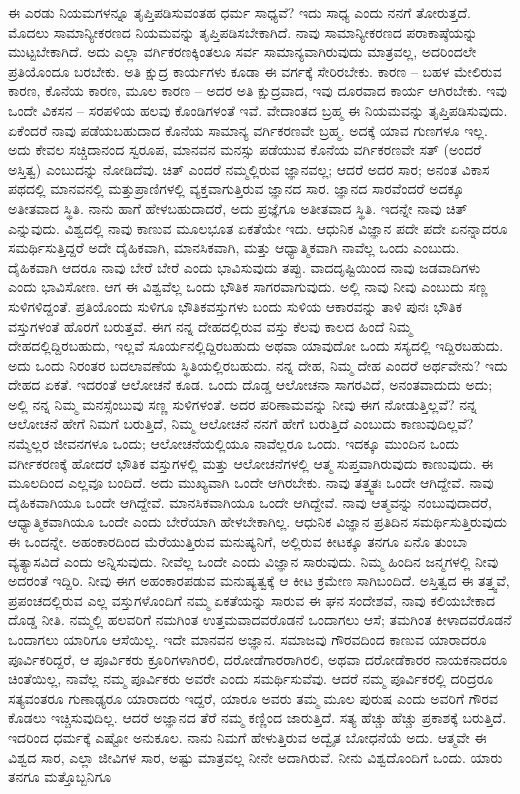 ಈ ಎರಡು ನಿಯಮಗಳನ್ನೂ ತೃಪ್ತಿಪಡಿಸುವಂತಹ ಧರ್ಮ ಸಾಧ್ಯವೆ? ಇದು ಸಾಧ್ಯ ಎಂದು ನನಗೆ ತೋರುತ್ತದೆ. ಮೊದಲು ಸಾಮಾನ್ಯೀಕರಣದ ನಿಯಮವನ್ನು ತೃಪ್ತಿಪಡಿಸಬೇಕಾಗಿದೆ. ನಾವು ಸಾಮಾನ್ಯೀಕರಣದ ಪರಾಕಾಷ್ಠೆಯನ್ನು ಮುಟ್ಟಬೇಕಾಗಿದೆ. ಅದು ಎಲ್ಲಾ ವರ್ಗಿಕರಣಕ್ಕಿಂತಲೂ ಸರ್ವ ಸಾಮಾನ್ಯವಾಗಿರುವುದು ಮಾತ್ರವಲ್ಲ, ಅದರಿಂದಲೇ ಪ್ರತಿಯೊಂದೂ ಬರಬೇಕು. ಅತಿ ಕ್ಷುದ್ರ ಕಾರ್ಯಗಳು ಕೂಡಾ ಈ ವರ್ಗಕ್ಕೆ ಸೇರಿರಬೇಕು. ಕಾರಣ – ಬಹಳ ಮೇಲಿರುವ ಕಾರಣ, ಕೊನೆಯ ಕಾರಣ, ಮೂಲ ಕಾರಣ – ಅದರ ಅತಿ ಕ್ಷುದ್ರವಾದ, ಇವು ದೂರವಾದ ಕಾರ್ಯ ಆಗಿರಬೇಕು. ಇವು ಒಂದೇ ವಿಕಸನ – ಸರಪಳಿಯ ಹಲವು ಕೊಂಡಿಗಳಂತೆ ಇವೆ. ವೇದಾಂತದ ಬ್ರಹ್ಮ ಈ ನಿಯಮವನ್ನು ತೃಪ್ತಿಪಡಿಸುವುದು. ಏಕೆಂದರೆ ನಾವು ಪಡೆಯಬಹುದಾದ ಕೊನೆಯ ಸಾಮಾನ್ಯ ವರ್ಗಿಕರಣವೇ ಬ್ರಹ್ಮ. ಅದಕ್ಕೆ ಯಾವ ಗುಣಗಳೂ ಇಲ್ಲ. ಅದು ಕೇವಲ ಸಚ್ಚಿದಾನಂದ ಸ್ವರೂಪ, ಮಾನವನ ಮನಸ್ಸು ಪಡೆಯುವ ಕೊನೆಯ ವರ್ಗಿಕರಣವೇ ಸತ್ (ಅಂದರೆ ಅಸ್ತಿತ್ವ) ಎಂಬುದನ್ನು ನೋಡಿದೆವು. ಚಿತ್ ಎಂದರೆ ನಮ್ಮಲ್ಲಿರುವ ಜ್ಞಾನವಲ್ಲ; ಆದರೆ ಅದರ ಸಾರ; ಅನಂತ ವಿಕಾಸ ಪಥದಲ್ಲಿ ಮಾನವನಲ್ಲಿ ಮತ್ತು\break ಪ್ರಾಣಿಗಳಲ್ಲಿ ವ್ಯಕ್ತವಾಗುತ್ತಿರುವ ಜ್ಞಾನದ ಸಾರ. ಜ್ಞಾನದ ಸಾರವೆಂದರೆ ಅದಕ್ಕೂ ಅತೀತವಾದ ಸ್ಥಿತಿ. ನಾನು ಹಾಗೆ ಹೇಳಬಹುದಾದರೆ, ಅದು ಪ್ರಜ್ಞೆಗೂ ಅತೀತವಾದ ಸ್ಥಿತಿ. ಇದನ್ನೇ ನಾವು ಚಿತ್ ಎನ್ನುವುದು. ವಿಶ್ವದಲ್ಲಿ ನಾವು ಕಾಣುವ ಮೂಲಭೂತ ಏಕತೆಯೇ ಇದು. ಆಧುನಿಕ ವಿಜ್ಞಾನ ಪದೇ ಪದೇ ಏನನ್ನಾದರೂ ಸಮರ್ಥಿಸುತ್ತಿದ್ದರೆ ಅದೇ ದೈಹಿಕವಾಗಿ, ಮಾನಸಿಕವಾಗಿ, ಮತ್ತು ಆಧ್ಯಾತ್ಮಿಕವಾಗಿ ನಾವೆಲ್ಲ ಒಂದು ಎಂಬುದು. ದೈಹಿಕವಾಗಿ ಆದರೂ ನಾವು ಬೇರೆ ಬೇರೆ ಎಂದು ಭಾವಿಸುವುದು ತಪ್ಪು. ವಾದದೃಷ್ಟಿಯಿಂದ ನಾವು ಜಡವಾದಿಗಳು ಎಂದು ಭಾವಿಸೋಣ. ಆಗ ಈ ವಿಶ್ವವೆಲ್ಲ ಒಂದು ಭೌತಿಕ ಸಾಗರವಾಗುವುದು. ಅಲ್ಲಿ ನಾವು ನೀವು ಎಂಬುದು ಸಣ್ಣ ಸುಳಿಗಳಿದ್ದಂತೆ. ಪ್ರತಿಯೊಂದು ಸುಳಿಗೂ ಭೌತಿಕವಸ್ತುಗಳು ಬಂದು ಸುಳಿಯ ಆಕಾರವನ್ನು ತಾಳಿ ಪುನಃ ಭೌತಿಕ ವಸ್ತುಗಳಂತೆ ಹೊರಗೆ ಬರುತ್ತವೆ. ಈಗ ನನ್ನ ದೇಹದಲ್ಲಿರುವ ವಸ್ತು ಕೆಲವು ಕಾಲದ ಹಿಂದೆ ನಿಮ್ಮ ದೇಹದಲ್ಲಿದ್ದಿರಬಹುದು, ಇಲ್ಲವೆ ಸೂರ್ಯನಲ್ಲಿದ್ದಿರಬಹುದು ಅಥವಾ ಯಾವುದೋ ಒಂದು ಸಸ್ಯದಲ್ಲಿ ಇದ್ದಿರಬಹುದು. ಅದು ಒಂದು ನಿರಂತರ ಬದಲಾವಣೆಯ ಸ್ಥಿತಿಯಲ್ಲಿರಬಹುದು. ನನ್ನ ದೇಹ, ನಿಮ್ಮ ದೇಹ ಎಂದರೆ ಅರ್ಥವೇನು? ಇದು ದೇಹದ ಏಕತೆ. ಇದರಂತೆ ಆಲೋಚನೆ ಕೂಡ. ಒಂದು ದೊಡ್ಡ ಆಲೋಚನಾ ಸಾಗರವಿದೆ, ಅನಂತವಾದುದು ಅದು; ಅಲ್ಲಿ ನನ್ನ ನಿಮ್ಮ ಮನಸ್ಸೆಂಬುವು ಸಣ್ಣ ಸುಳಿಗಳಂತೆ. ಅದರ ಪರಿಣಾಮವನ್ನು ನೀವು ಈಗ ನೋಡುತ್ತಿಲ್ಲವೆ? ನನ್ನ ಆಲೋಚನೆ ಹೇಗೆ ನಿಮಗೆ ಬರುತ್ತಿದೆ, ನಿಮ್ಮ ಆಲೋಚನೆ ನನಗೆ ಹೇಗೆ ಬರುತ್ತಿದೆ ಎಂಬುದು ಕಾಣುವುದಿಲ್ಲವೆ? ನಮ್ಮೆಲ್ಲರ ಜೀವನಗಳೂ ಒಂದು; ಆಲೋಚನೆಯಲ್ಲಿಯೂ ನಾವೆಲ್ಲರೂ ಒಂದು. ಇದಕ್ಕೂ ಮುಂದಿನ ಒಂದು ವರ್ಗೀಕರಣಕ್ಕೆ ಹೋದರೆ ಭೌತಿಕ ವಸ್ತುಗಳಲ್ಲಿ ಮತ್ತು ಆಲೋಚನೆಗಳಲ್ಲಿ ಆತ್ಮ ಸುಪ್ತವಾಗಿರುವುದು ಕಾಣುವುದು. ಈ ಮೂಲದಿಂದ ಎಲ್ಲವೂ ಬಂದಿದೆ. ಅದು ಮುಖ್ಯವಾಗಿ ಒಂದೇ ಆಗಿರಬೇಕು. ನಾವು ತತ್ತ್ವತಃ ಒಂದೇ ಆಗಿದ್ದೇವೆ. ನಾವು ದೈಹಿಕವಾಗಿಯೂ ಒಂದೇ ಆಗಿದ್ದೇವೆ. ಮಾನಸಿಕವಾಗಿಯೂ ಒಂದೇ ಆಗಿದ್ದೇವೆ. ನಾವು ಆತ್ಮವನ್ನು ನಂಬುವುದಾದರೆ, ಆಧ್ಯಾತ್ಮಿಕವಾಗಿಯೂ ಒಂದೇ ಎಂದು ಬೇರೆಯಾಗಿ ಹೇಳಬೇಕಾಗಿಲ್ಲ. ಆಧುನಿಕ ವಿಜ್ಞಾನ ಪ್ರತಿದಿನ ಸಮರ್ಥಿಸುತ್ತಿರುವುದು ಈ ಒಂದನ್ನೇ. ಅಹಂಕಾರದಿಂದ ಮೆರೆಯುತ್ತಿರುವ ಮನುಷ್ಯನಿಗೆ, ಅಲ್ಲಿರುವ ಕೀಟಕ್ಕೂ ತನಗೂ ಏನೊ ತುಂಬಾ ವ್ಯತ್ಯಾಸವಿದೆ ಎಂದು ಅನ್ನಿಸುವುದು. ನೀವೆಲ್ಲ ಒಂದೇ ಎಂದು ವಿಜ್ಞಾನ ಸಾರುವುದು. ನಿಮ್ಮ ಹಿಂದಿನ ಜನ್ಮಗಳಲ್ಲಿ ನೀವು ಅದರಂತೆ ಇದ್ದಿರಿ. ನೀವು ಈಗ ಅಹಂಕಾರಪಡುವ ಮನುಷ್ಯತ್ವಕ್ಕೆ ಆ ಕೀಟ ಕ್ರಮೇಣ ಸಾಗಿಬಂದಿದೆ. ಅಸ್ತಿತ್ವದ ಈ ತತ್ತ್ವವೆ, ಪ್ರಪಂಚದಲ್ಲಿರುವ ಎಲ್ಲ ವಸ್ತುಗಳೊಂದಿಗೆ ನಮ್ಮ ಏಕತೆಯನ್ನು ಸಾರುವ ಈ ಘನ ಸಂದೇಶವೆ, ನಾವು ಕಲಿಯಬೇಕಾದ ದೊಡ್ಡ ನೀತಿ. ನಮ್ಮಲ್ಲಿ ಹಲವರಿಗೆ ನಮಗಿಂತ ಉತ್ತಮವಾದವರೊಡನೆ ಒಂದಾಗಲು ಆಸೆ; ತಮಗಿಂತ ಕೀಳಾದವರೊಡನೆ ಒಂದಾಗಲು ಯಾರಿಗೂ ಆಸೆಯಿಲ್ಲ. ಇದೇ ಮಾನವನ ಅಜ್ಞಾನ. ಸಮಾಜವು ಗೌರವದಿಂದ ಕಾಣುವ ಯಾರಾದರೂ ಪೂರ್ವಿಕರಿದ್ದರೆ, ಆ ಪೂರ್ವಿಕರು ಕ್ರೂರಿಗಳಾಗಿರಲಿ, ದರೋಡೆಗಾರರಾಗಿರಲಿ, ಅಥವಾ ದರೋಡೆಕಾರರ ನಾಯಕನಾದರೂ ಚಿಂತೆಯಿಲ್ಲ, ನಾವೆಲ್ಲ ನಮ್ಮ ಪೂರ್ವಿಕರು ಅವರೇ ಎಂದು ಸಮರ್ಥಿಸುವೆವು. ಆದರೆ ನಮ್ಮ ಪೂರ್ವಿಕರಲ್ಲಿ ದರಿದ್ರರೂ ಸತ್ಯವಂತರೂ ಗುಣಾಢ್ಯರೂ ಯಾರಾದರು ಇದ್ದರೆ, ಯಾರೂ ಅವರು ತಮ್ಮ ಮೂಲ ಪುರುಷ ಎಂದು ಅವರಿಗೆ ಗೌರವ ಕೊಡಲು ಇಚ್ಚಿಸುವುದಿಲ್ಲ. ಆದರೆ ಅಜ್ಞಾನದ ತೆರೆ ನಮ್ಮ ಕಣ್ಣಿಂದ ಜಾರುತ್ತಿದೆ. ಸತ್ಯ ಹೆಚ್ಚು ಹೆಚ್ಚು ಪ್ರಕಾಶಕ್ಕೆ ಬರುತ್ತಿದೆ. ಇದರಿಂದ ಧರ್ಮಕ್ಕೆ ಎಷ್ಟೋ ಅನುಕೂಲ. ನಾನು ನಿಮಗೆ ಹೇಳುತ್ತಿರುವ ಅದ್ವೈತ ಬೋಧನೆಯೆ ಅದು. ಆತ್ಮವೇ ಈ ವಿಶ್ವದ ಸಾರ, ಎಲ್ಲಾ ಜೀವಿಗಳ ಸಾರ, ಅಷ್ಟು ಮಾತ್ರವಲ್ಲ ನೀನೇ ಅದಾಗಿರುವೆ. ನೀನು ವಿಶ್ವದೊಂದಿಗೆ ಒಂದು. ಯಾರು ತನಗೂ ಮತ್ತೊಬ್ಬನಿಗೂ 
